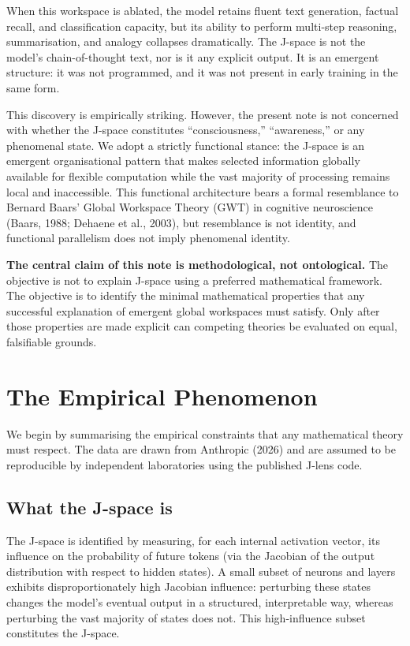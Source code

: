 \documentclass[11pt,a4paper]{article}
\theoremstyle{definition}
\begin{document}
When this workspace is ablated, the model retains fluent text generation,
factual recall, and classification capacity, but its ability to perform
multi-step reasoning, summarisation, and analogy collapses dramatically.
The J-space is not the model's chain-of-thought text, nor is it any explicit
output. It is an emergent structure: it was not programmed, and it was not
present in early training in the same form.

This discovery is empirically striking. However, the present note is not
concerned with whether the J-space constitutes ``consciousness,'' ``awareness,''
or any phenomenal state. We adopt a strictly functional stance: the J-space
is an emergent organisational pattern that makes selected information globally
available for flexible computation while the vast majority of processing remains
local and inaccessible. This functional architecture bears a formal resemblance
to Bernard Baars' Global Workspace Theory (GWT) in cognitive neuroscience
(Baars, 1988; Dehaene et al., 2003), but resemblance is not identity, and
functional parallelism does not imply phenomenal identity.

\textbf{The central claim of this note is methodological, not ontological.}
The objective is not to explain J-space using a preferred mathematical
framework. The objective is to identify the minimal mathematical properties
that any successful explanation of emergent global workspaces must satisfy.
Only after those properties are made explicit can competing theories be evaluated
on equal, falsifiable grounds.

\section{The Empirical Phenomenon}
\label{sec:empirical}

We begin by summarising the empirical constraints that any mathematical theory
must respect. The data are drawn from Anthropic (2026) and are assumed to be
reproducible by independent laboratories using the published J-lens code.

\subsection{What the J-space is}

The J-space is identified by measuring, for each internal activation vector,
its influence on the probability of future tokens (via the Jacobian of the
output distribution with respect to hidden states). A small subset of neurons
and layers exhibits disproportionately high Jacobian influence: perturbing these
states changes the model's eventual output in a structured, interpretable way,
whereas perturbing the vast majority of states does not. This high-influence
subset constitutes the J-space.
\end{document}

